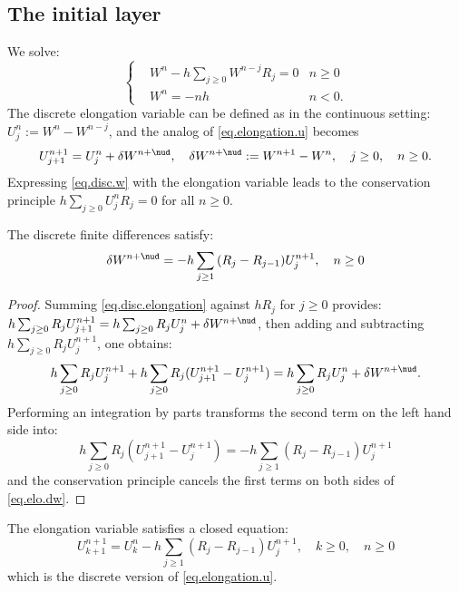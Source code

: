\documentclass[]{jnsao}
\renewcommand{\tr}{R}
\begin{document}
 \subsection{The initial layer}\label{subsec:discrete}
We solve:
 \begin{equation}\label{eq.disc.w}
 	\left\{\begin{aligned}
 		&	 W^n - h\sum_{j\geq 0} W^{n-j} \tr_j =0 & n \geq 0 \\
 		& W^n = - nh & n< 0.
 	\end{aligned}
 	\right.
 \end{equation} 
 The discrete elongation variable can be defined as in the continuous setting: $U^n_j := W^n - W^{n-j}$, and the analog of \eqref{eq.elongation.u} becomes
 \begin{equation}\label{eq.disc.elongation}
 	U^{n+1}_{j+1} = U^n_j + \delta W^{n+\nud} ,\quad \delta W^{n+\nud} := W^{n+1}-W^n, \quad j\geq0,\quad n\geq 0.
 \end{equation}
Expressing \eqref{eq.disc.w} with the elongation variable leads to the conservation principle $h \sum_{j\ge0} U^n_j \tr_j = 0$ for all $n\ge0$. 
		
\begin{lemma}
	The discrete finite differences satisfy:
	$$
	\delta W^{n+\nud} = - h \sum_{j\geq 1} {(\tr_j - \tr_{j-1})} U^{n+1}_j,\quad n\geq 0
	$$
\end{lemma} 
 
\begin{proof}
	Summing \eqref{eq.disc.elongation} against $h \tr_j$ for $j\geq 0$  
	provides: 
	$h \sum_{j\geq 0} \tr_j U^{n+1}_{j+1} = h \sum_{j\geq 0} \tr_j U^n_j + \delta W^{n+\nud}$, 
	then adding and subtracting $h \sum_{j\geq 0} \tr_j U^{n+1}_j$, one obtains:
	\begin{equation}\label{eq.elo.dw}
		h \sum_{j\geq 0} \tr_j U^{n+1}_j + h \sum_{j\geq 0} \tr_j (U^{n+1}_{j+1}- U^{n+1}_j) = h \sum_{j\geq 0} \tr_j U^n_j + \delta W^{n+\nud}.
	\end{equation}
	Performing an integration by parts transforms the second term on the left hand side into:
	$$
	h \sum_{j\geq 0} \tr_j (U^{n+1}_{j+1}- U^{n+1}_j)  = - h \sum_{j\geq 1} {(\tr_j - \tr_{j-1})} U^{n+1}_j
	$$
	and the conservation principle cancels the first terms on both sides of \eqref{eq.elo.dw}.
\end{proof} 
 
\begin{corollary}
	The elongation variable satisfies a closed equation:
	\begin{equation}\label{eq.closed.disc.elongation}
		U^{n+1}_{k+1} = U^n_k - h \sum_{j\geq 1} {(\tr_j - \tr_{j-1})} U^{n+1}_j, \quad k\geq 0 ,\quad n\geq 0
	\end{equation}
	which is the discrete version of \eqref{eq.elongation.u}.
\end{corollary} 
 
\end{document}
